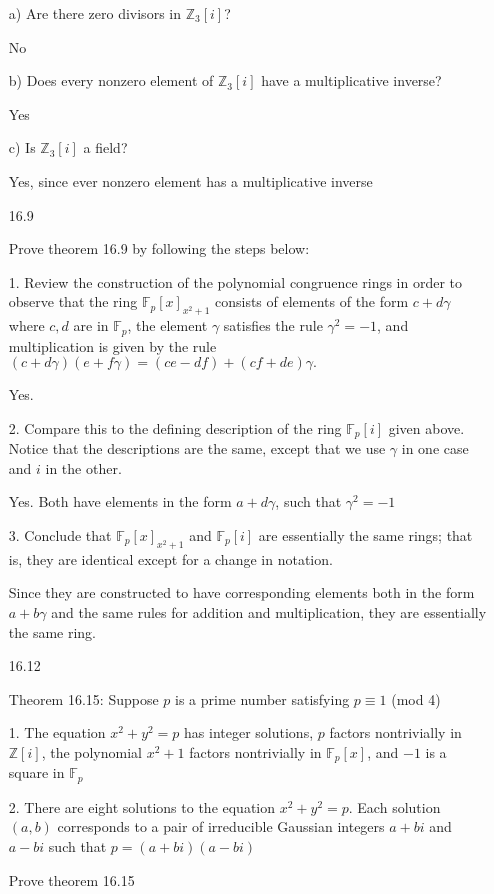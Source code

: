 \documentclass[12pt]{article}
\begin{document}
\begin{itemize}
a) Are there zero divisors in $\mathbb{Z}_3[i]$?

No

b) Does every nonzero element of $\mathbb{Z}_3[i]$ have a multiplicative inverse?

Yes

c) Is $\mathbb{Z}_3[i]$ a field?

Yes, since ever nonzero element has a multiplicative inverse

\newpage
\item[16.9]

Prove theorem 16.9 by following the steps below:

1. Review the construction of the polynomial congruence rings in order to observe that the ring $\mathbb{F}_p[x]_{x^2 + 1}$ consists of elements of the form $c+d\gamma$ where $c, d$ are in $\mathbb{F}_p$, the element $\gamma$ satisfies the rule $\gamma^2 = -1$, and multiplication is given by the rule $(c + d\gamma)(e + f\gamma) = (ce - df) + (cf + de)\gamma.$

Yes.

2. Compare this to the defining description of the ring $\mathbb{F}_p[i]$ given above. Notice that the descriptions are the same, except that we use $\gamma$ in one case and $i$ in the other.

Yes. Both have elements in the form $a + d\gamma$, such that $\gamma^2 = -1$

3. Conclude that $\mathbb{F}_p[x]_{x^2+1}$ and $\mathbb{F}_p[i]$ are essentially the same rings; that is, they are identical except for a change in notation.

Since they are constructed to have corresponding elements both in the form $a+b\gamma$ and the same rules for addition and multiplication, they are essentially the same ring.

\newpage
\item[16.12]

	Theorem 16.15: Suppose $p$ is a prime number satisfying $p \equiv 1$ (mod 4)

	1. The equation $x^2 + y^2 = p$ has integer solutions, $p$ factors nontrivially in $\mathbb{Z}[i]$, the polynomial $x^2 + 1$ factors nontrivially in $\mathbb{F}_p[x]$, and $-1$ is a square in $\mathbb{F}_p$

	2. There are eight solutions to the equation $x^2 + y^2 = p$. Each solution $(a,b)$ corresponds to a pair of irreducible Gaussian integers $a + bi$ and $a-bi$ such that $p = (a+bi)(a-bi)$

Prove theorem 16.15


\end{itemize}
\end{document}

